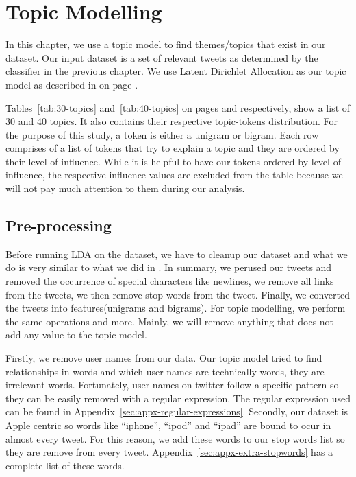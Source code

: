 \chapter{Topic Modelling}
\label{cha:topic-modelling}
In this chapter, we use a topic model to find themes/topics that exist in our dataset. Our input
dataset is a set of relevant tweets as determined by the classifier in the previous chapter. We use
Latent Dirichlet Allocation as our topic model as described in  on page
\pageref{sec:bg-lda}.

Tables~\ref{tab:30-topics} and~\ref{tab:40-topics} on pages \pageref{tab:30-topics} and
\pageref{tab:40-topics} respectively, show a list of 30 and 40 topics. It also contains their
respective topic-tokens distribution. For the purpose of this study, a token is either a unigram or
bigram. Each row comprises of a list of tokens that try to explain a topic and they are ordered by
their level of influence. While it is helpful to have our tokens ordered by level of influence, the
respective influence values are excluded from the table because we will not pay much attention to
them during our analysis.


\section{Pre-processing}
\label{sec:lda-preprocessing}
Before running LDA on the dataset, we have to cleanup our dataset and what we do is very similar to
what we did in . In summary, we perused our tweets
and removed the occurrence of special characters like newlines, we remove all links from the tweets,
we then remove stop words from the tweet. Finally, we converted the tweets into features(unigrams
and bigrams). For topic modelling, we perform the same operations and more. Mainly, we will remove
anything that does not add any value to the topic model.

Firstly, we remove user names from our data. Our topic model tried to find relationships in words
and which user names are technically words, they are irrelevant words. Fortunately, user names on
twitter follow a specific pattern so they can be easily removed with a regular expression. The
regular expression used can be found in Appendix~\ref{sec:appx-regular-expressions}. Secondly, our
dataset is Apple centric so words like ``iphone'', ``ipod'' and ``ipad'' are bound to ocur in almost
every tweet. For this reason, we add these words to our stop words list so they are remove from
every tweet. Appendix~\ref{sec:appx-extra-stopwords} has a complete list of these words.

